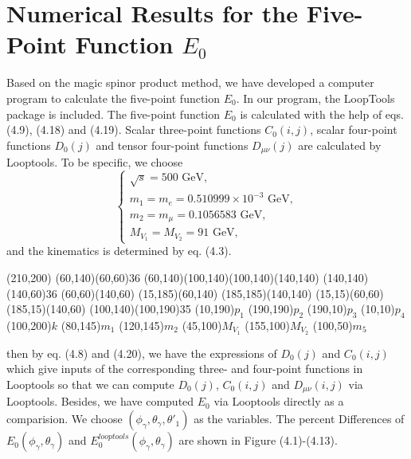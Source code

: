 \section{Numerical Results for the Five-Point Function $E_0$}
Based on the magic spinor product method, we have developed a computer program to calculate the five-point function $E_0$. In our program, the LoopTools package is included. The five-point function $E_0$ is calculated with the help of eqs. (4.9), (4.18) and (4.19). Scalar three-point functions $C_0(i,j)$, scalar four-point functions $D_0(j)$ and tensor four-point functions $D_{\mu\nu}(j)$ are calculated by Looptools. To be specific, we choose
\begin{equation*}
\begin{cases}
\sqrt{s}=500\text{ GeV},\\
m_1=m_e=0.510999\times 10^{-3}\text{ GeV},\\
m_2=m_\mu=0.1056583\text{ GeV},\\
M_{V_1}=M_{V_2}=91\text{ GeV},
\end{cases}
\end{equation*}
and the kinematics is determined by eq. (4.3).

\begin{center}
	\begin{axopicture}(210,200)
		\Photon(60,140)(60,60){3}{6}
		\Line(60,140)(100,140)\Line(100,140)(140,140)
		\Photon(140,140)(140,60){3}{6}
		\Line(60,60)(140,60)
		\Line[arrow](15,185)(60,140)
		\Line[arrow](185,185)(140,140)
		\Line[arrow](15,15)(60,60)
		\Line[arrow](185,15)(140,60)
		\Photon(100,140)(100,190){3}{5}
		\Text(10,190){$p_1$}
		\Text(190,190){$p_2$}
		\Text(190,10){$p_3$}
		\Text(10,10){$p_4$}
		\Text(100,200){$k$}
		\Text(80,145){$m_1$}
		\Text(120,145){$m_2$}
		\Text(45,100){$M_{V_1}$}
		\Text(155,100){$M_{V_2}$}
		\Text(100,50){$m_5$}
	\end{axopicture}
\end{center}
then by eq. (4.8) and (4.20), we have the expressions of $D_0(j)$ and $C_0(i,j)$ which give inputs of the corresponding three- and four-point functions in Looptools so that we can compute $D_0(j)$, $C_0(i,j)$ and $D_{\mu\nu}(i,j)$ via Looptools. Besides, we have computed $E_0$ via Looptools directly as a comparision. We choose $(\phi_\gamma,\theta_\gamma,\theta'_1)$ as the variables. The percent Differences of $E_0(\phi_\gamma,\theta_\gamma)$ and $E_0^{looptools}(\phi_\gamma,\theta_\gamma)$ are shown in Figure (4.1)-(4.13).


